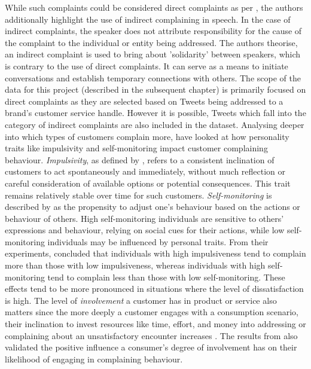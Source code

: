 While such complaints could be considered direct complaints as per \cite{boxerSocialDistanceSpeech1993}, the authors additionally highlight the use of indirect complaining in speech. In the case of indirect complaints, the speaker does not attribute responsibility for the cause of the complaint to the individual or entity being addressed. The authors theorise, an indirect complaint is used to bring about 'solidarity' between speakers, which is contrary to the use of direct complaints. It can serve as a means to initiate conversations and establish temporary connections with others. The scope of the data for this project (described in the subsequent chapter) is primarily focused on direct complaints as they are selected based on Tweets being addressed to a brand's customer service handle. However it is possible, Tweets which fall into the category of indirect complaints are also included in the dataset.
\newline \newline
Analysing deeper into which types of customers complain more, \cite{sharma_complainers_2010} have looked at how personality traits like impulsivity and self-monitoring impact customer complaining behaviour. \textit{Impulsivity}, as defined by \cite{rookNormativeInfluencesImpulsive1995}, refers to a consistent inclination of customers to act spontaneously and immediately,  without much reflection or careful consideration of available options or potential consequences. This trait remains relatively stable over time for such customers. \textit{Self-monitoring} is described by  \cite{bechererSelfMonitoringModeratingVariable1978} as the propensity to adjust one's behaviour based on the actions or behaviour of others. High self-monitoring individuals are sensitive to others' expressions and behaviour, relying on social cues for their actions, while low self-monitoring individuals may be influenced by personal traits. From their experiments, \cite{sharma_complainers_2010} concluded that individuals with high impulsiveness tend to complain more than those with low impulsiveness, whereas individuals with high self-monitoring tend to complain less than those with low self-monitoring. These effects tend to be more pronounced in situations where the level of dissatisfaction is high. The level of \textit{involvement} a customer has in product or service also matters since the more deeply a customer engages with a consumption scenario, their inclination to invest resources like time, effort, and money into addressing or complaining about an unsatisfactory encounter increases \cite{lauIndividualSituationalFactors2001}. The results from \cite{sharma_complainers_2010} also validated the positive influence a consumer's degree of involvement has on their likelihood of engaging in complaining behaviour.


